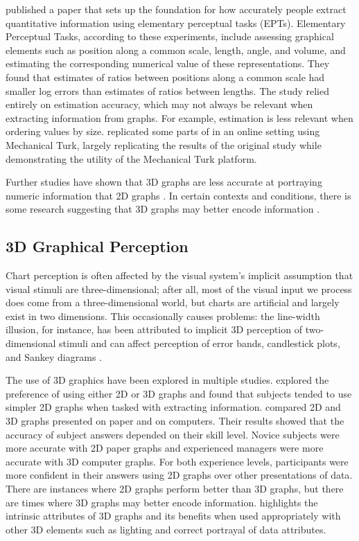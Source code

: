 \documentclass[letterpaper,inpress,dvipsnames]{jdsart}
\begin{document}
\citet{cleveland_graphical_1984} published a paper that sets up the foundation for how accurately people extract quantitative information using elementary perceptual tasks (EPTs).
Elementary Perceptual Tasks, according to these experiments, include assessing graphical elements such as position along a common scale, length, angle, and volume, and estimating the corresponding numerical value of these representations.
They found that estimates of ratios between positions along a common scale had smaller log errors than estimates of ratios between lengths. The study relied entirely on estimation accuracy, which may not always be relevant when extracting information from graphs. For example, estimation is less relevant when ordering values by size.
\citet{heerCrowdsourcingGraphicalPerception2010b} replicated some parts of \citet{cleveland_graphical_1984} in an online setting using Mechanical Turk, largely replicating the results of the original study while demonstrating the utility of the Mechanical Turk platform.

Further studies have shown that 3D graphs are less accurate at portraying numeric information that 2D graphs \citep{barfield_effects_1989, fisher_data_1997}. In certain contexts and conditions, there is some research suggesting that 3D graphs may better encode information \citep{brath_3d_2014}.

\hypertarget{d-graphical-perception}{%
\subsection{3D Graphical Perception}\label{d-graphical-perception}}

Chart perception is often affected by the visual system's implicit assumption that visual stimuli are three-dimensional; after all, most of the visual input we process does come from a three-dimensional world, but charts are artificial and largely exist in two dimensions.
This occasionally causes problems: the line-width illusion, for instance, has been attributed to implicit 3D perception of two-dimensional stimuli and can affect perception of error bands, candlestick plots, and Sankey diagrams \citep{vanderplasSignsSineIllusion2015, daySineIllusion1991, hofmannCommonAnglePlots2013}.

The use of 3D graphics have been explored in multiple studies.
\citet{fisher_data_1997} explored the preference of using either 2D or 3D graphs and found that subjects tended to use simpler 2D graphs when tasked with extracting information. \citet{barfield_effects_1989} compared 2D and 3D graphs presented on paper and on computers.
Their results showed that the accuracy of subject answers depended on their skill level.
Novice subjects were more accurate with 2D paper graphs and experienced managers were more accurate with 3D computer graphs.
For both experience levels, participants were more confident in their answers using 2D graphs over other presentations of data.
There are instances where 2D graphs perform better than 3D graphs, but there are times where 3D graphs may better encode information.
\citet{brath_3d_2014} highlights the intrinsic attributes of 3D graphs and its benefits when used appropriately with other 3D elements such as lighting and correct portrayal of data attributes.
\end{document}
